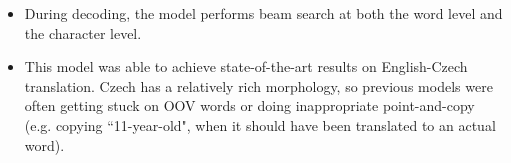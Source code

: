 \begin{itemize}
\begin{itemize}
\begin{itemize}
\end{itemize}
\item During decoding, the model performs beam search at both the word level and the character level.
\item This model was able to achieve state-of-the-art results on English-Czech translation. Czech has a relatively rich morphology, so previous models were often getting stuck on OOV words or doing inappropriate point-and-copy (e.g. copying ``11-year-old", when it should have been translated to an actual word).
\end{itemize}
\end{itemize}
